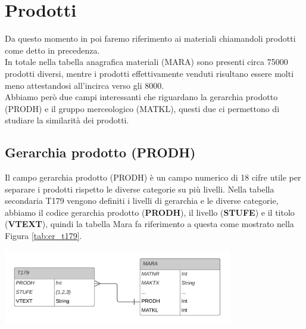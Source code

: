 \section{Prodotti}
Da questo momento in poi faremo riferimento ai materiali chiamandoli prodotti come detto in precedenza.\\
In totale nella tabella anagrafica materiali (MARA) sono presenti circa 75000 prodotti diversi, mentre i prodotti effettivamente venduti risultano essere molti meno attestandosi all'incirca verso gli 8000.\\
Abbiamo però due campi interessanti che riguardano la gerarchia prodotto (PRODH) e il gruppo merceologico (MATKL), questi due ci permettono di studiare la similarità dei prodotti.

\subsection{Gerarchia prodotto (PRODH)}
Il campo gerarchia prodotto (PRODH) è un campo numerico di 18 cifre utile per separare i prodotti rispetto le diverse categorie su più livelli.
Nella tabella secondaria T179 vengono definiti i livelli di gerarchia e le diverse categorie, abbiamo il codice gerarchia prodotto (\textbf{PRODH}), il livello (\textbf{STUFE}) e il titolo (\textbf{VTEXT}), quindi la tabella Mara fa riferimento a questa come mostrato nella Figura \ref{tab:er_t179}.
\begin{center}
	\includegraphics[width=10cm]{figures/ER_T179.png}
	\label{tab:er_t179}
\end{center}

